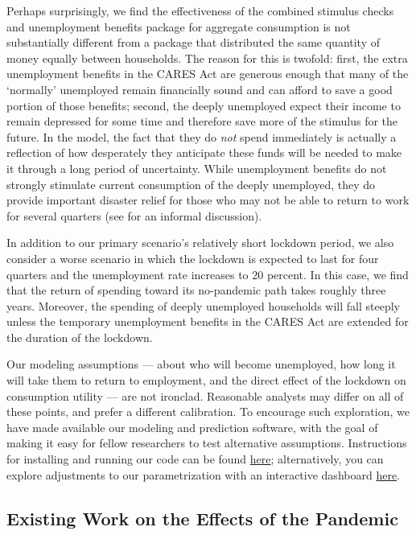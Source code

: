 \documentclass[titlepage]{\econtex}
\begin{document}
Perhaps surprisingly, we find the effectiveness of the combined stimulus checks and unemployment benefits package for aggregate consumption is not substantially different from a package that distributed the same quantity of money equally between households.
The reason for this is twofold: first, the extra unemployment benefits in the CARES Act are generous enough that many of the `normally' unemployed remain financially sound and can afford to save a good portion of those benefits; second, the deeply unemployed expect their income to remain depressed for some time and therefore save more of the stimulus for the future.  In the model, the fact that they do \textit{not} spend immediately is actually a reflection of how desperately they anticipate these funds will be needed to make it through a long period of uncertainty.
While unemployment benefits do not strongly stimulate current consumption of the deeply unemployed, they do provide important disaster relief for those who may not be able to return to work for several quarters (see \cite{krugman_corona} for an informal discussion).

In addition to our primary scenario's relatively short lockdown period, we also consider a worse scenario in which the lockdown is expected to last for four quarters and the unemployment rate increases to 20 percent.
In this case, we find that the return of spending toward its no-pandemic path takes roughly three years. Moreover, the spending of deeply unemployed households will fall steeply unless the temporary unemployment benefits in the CARES Act are extended for the duration of the lockdown.  

Our modeling assumptions --- about who will become unemployed, how long it will take them to return to employment, and the direct effect of the lockdown on consumption utility --- are not ironclad.
Reasonable analysts may differ on all of these points, and prefer a different calibration.
To encourage such exploration, we have made available our modeling and prediction software, with the goal of making it easy for fellow researchers to test alternative assumptions.  Instructions for installing and running our code can be found \href{https://github.com/econ-ark/Pandemic#reproduction-instructions}{here}; alternatively, you can explore adjustments to our parametrization with an interactive dashboard \href{http://www.google.com}{here}.

\subsection*{Existing Work on the Effects of the Pandemic}
\end{document}
